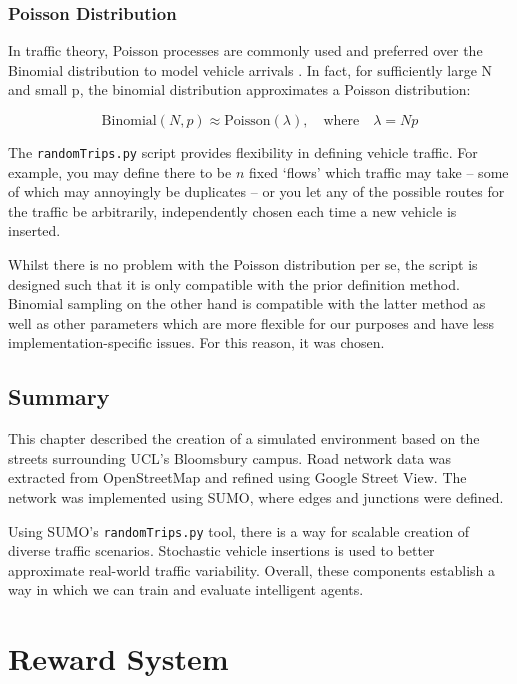 \documentclass[a4paper]{report}
\begin{document}
\subsection{Poisson Distribution}

In traffic theory, Poisson processes are commonly used and preferred over the Binomial distribution to model vehicle arrivals \cite{GerloughSchuhl1955}. In fact, for sufficiently large N and small p, the binomial distribution approximates a Poisson distribution:

\[
\mathrm{Binomial}(N, p) \approx \mathrm{Poisson}(\lambda),
\quad \text{where} \quad \lambda = Np
\]

The \texttt{randomTrips.py} script provides flexibility in defining vehicle traffic. For example, you may define there to be \( n \) fixed `flows' which traffic may take -- some of which may annoyingly be duplicates -- or you let any of the possible routes for the traffic be arbitrarily, independently chosen each time a new vehicle is inserted.

Whilst there is no problem with the Poisson distribution per se, the script is designed such that it is only compatible with the prior definition method. Binomial sampling on the other hand is compatible with the latter method as well as other parameters which are more flexible for our purposes and have less implementation-specific issues. For this reason, it was chosen.

\section{Summary}

This chapter described the creation of a simulated environment based on the streets surrounding UCL's Bloomsbury campus. Road network data was extracted from OpenStreetMap and refined using Google Street View. The network was implemented using SUMO, where edges and junctions were defined.

Using SUMO's \texttt{randomTrips.py} tool, there is a way for scalable creation of diverse traffic scenarios. Stochastic vehicle insertions is used to better approximate real-world traffic variability. Overall, these components establish a way in which we can train and evaluate intelligent agents.

\chapter{Reward System} \label{chapter:reward_system}
\end{document}
